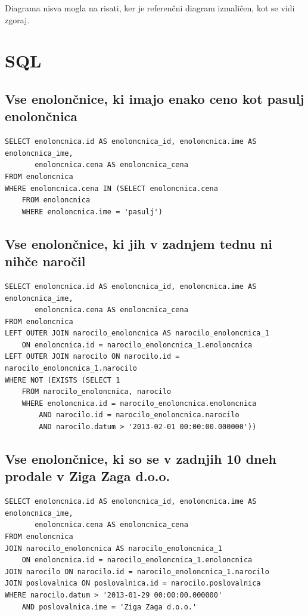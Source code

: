 \documentclass[12pt]{article}
\let\stdsection\section
\renewcommand\section{\newpage\stdsection}
\begin{document}
Diagrama nisva mogla na risati, ker je referenčni diagram izmaličen, kot se vidi zgoraj.


\newpage

\section{SQL}

\subsection{Vse enolončnice, ki imajo enako ceno kot pasulj enolončnica}

\begin{verbatim}
SELECT enoloncnica.id AS enoloncnica_id, enoloncnica.ime AS enoloncnica_ime,
       enoloncnica.cena AS enoloncnica_cena 
FROM enoloncnica 
WHERE enoloncnica.cena IN (SELECT enoloncnica.cena 
    FROM enoloncnica 
    WHERE enoloncnica.ime = 'pasulj')
\end{verbatim}

\subsection{Vse enolončnice, ki jih v zadnjem tednu ni nihče naročil}

\begin{verbatim}
SELECT enoloncnica.id AS enoloncnica_id, enoloncnica.ime AS enoloncnica_ime,
       enoloncnica.cena AS enoloncnica_cena 
FROM enoloncnica
LEFT OUTER JOIN narocilo_enoloncnica AS narocilo_enoloncnica_1
    ON enoloncnica.id = narocilo_enoloncnica_1.enoloncnica
LEFT OUTER JOIN narocilo ON narocilo.id = narocilo_enoloncnica_1.narocilo 
WHERE NOT (EXISTS (SELECT 1 
    FROM narocilo_enoloncnica, narocilo 
    WHERE enoloncnica.id = narocilo_enoloncnica.enoloncnica
        AND narocilo.id = narocilo_enoloncnica.narocilo
        AND narocilo.datum > '2013-02-01 00:00:00.000000'))
\end{verbatim}

\subsection{Vse enolončnice, ki so se v zadnjih 10 dneh prodale v Ziga Zaga d.o.o.}

\begin{verbatim}
SELECT enoloncnica.id AS enoloncnica_id, enoloncnica.ime AS enoloncnica_ime,
       enoloncnica.cena AS enoloncnica_cena 
FROM enoloncnica
JOIN narocilo_enoloncnica AS narocilo_enoloncnica_1
    ON enoloncnica.id = narocilo_enoloncnica_1.enoloncnica
JOIN narocilo ON narocilo.id = narocilo_enoloncnica_1.narocilo
JOIN poslovalnica ON poslovalnica.id = narocilo.poslovalnica 
WHERE narocilo.datum > '2013-01-29 00:00:00.000000'
    AND poslovalnica.ime = 'Ziga Zaga d.o.o.'
\end{verbatim}
\end{document}

